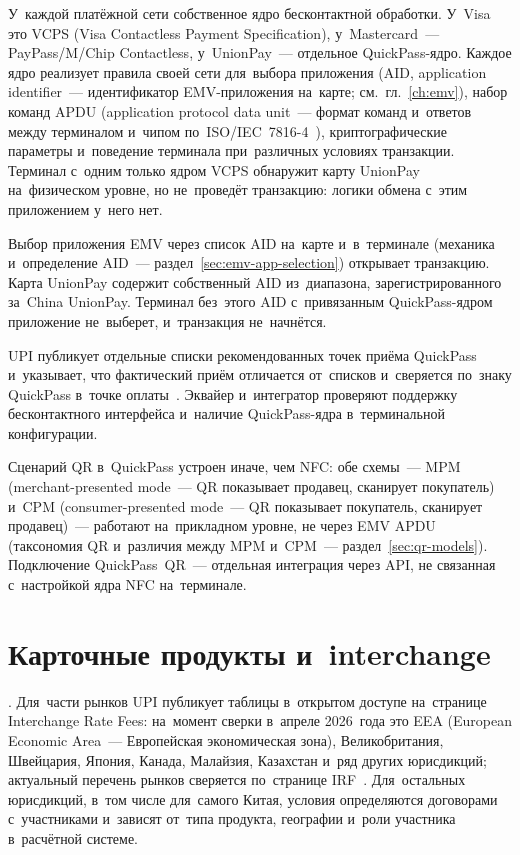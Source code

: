 У~каждой платёжной сети собственное ядро бесконтактной обработки. У~Visa
это VCPS (Visa Contactless Payment Specification), у~Mastercard~---
PayPass/M/Chip Contactless, у~UnionPay~--- отдельное QuickPass-ядро. Каждое
ядро реализует правила своей сети для~выбора приложения (AID,
  application identifier~--- идентификатор EMV-приложения на~карте;
см.~гл.~\ref{ch:emv}), набор команд APDU (application protocol data unit~---
  формат команд и~ответов между терминалом и~чипом
по~ISO/IEC~7816-4~\cite{iso-7816-4}), криптографические параметры и~поведение
терминала при~различных условиях транзакции. Терминал с~одним только ядром VCPS
обнаружит карту UnionPay на~физическом уровне, но не~проведёт транзакцию:
логики обмена с~этим приложением у~него нет.

Выбор приложения EMV через список AID на~карте и~в~терминале (механика
и~определение AID~--- раздел~\ref{sec:emv-app-selection}) открывает
транзакцию. Карта UnionPay содержит собственный AID из~диапазона,
зарегистрированного за~China UnionPay. Терминал без~этого AID с~привязанным
QuickPass-ядром приложение не~выберет, и~транзакция не~начнётся.

UPI публикует отдельные списки рекомендованных точек приёма QuickPass и~указывает, что
фактический приём отличается от~списков и~сверяется по~знаку
QuickPass в~точке оплаты~\cite{unionpay-quickpass-merchants}. Эквайер
и~интегратор проверяют поддержку бесконтактного интерфейса и~наличие
QuickPass-ядра в~терминальной конфигурации.

Сценарий QR в~QuickPass устроен иначе, чем NFC: обе схемы~--- MPM
(merchant-presented mode~--- QR показывает продавец, сканирует покупатель)
и~CPM (consumer-presented mode~--- QR показывает покупатель, сканирует
продавец)~--- работают на~прикладном уровне, не через EMV APDU (таксономия QR
и~различия между MPM и~CPM~--- раздел~\ref{sec:qr-models}). Подключение
QuickPass~QR~--- отдельная интеграция через API, не связанная с~настройкой ядра
NFC на~терминале.

\section{Карточные продукты и~interchange}\label{sec:up-products}

. Для~части рынков UPI публикует таблицы
в~открытом доступе на~странице Interchange Rate Fees: на~момент сверки в~апреле
2026~года это EEA (European Economic Area~--- Европейская экономическая зона),
Великобритания, Швейцария, Япония, Канада, Малайзия, Казахстан и~ряд других
юрисдикций; актуальный перечень рынков сверяется по~странице
IRF~\cite{unionpay-irf}. Для~остальных юрисдикций, в~том числе для~самого
Китая, условия определяются договорами с~участниками и~зависят от~типа
продукта, географии и~роли участника в~расчётной системе.

